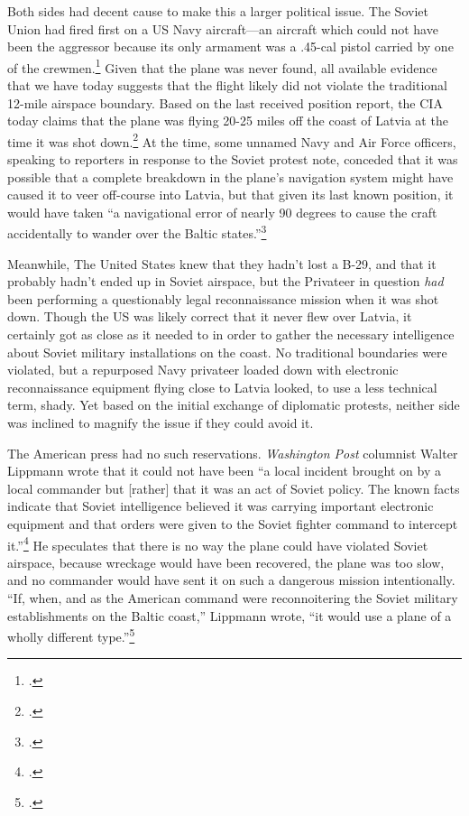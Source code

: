 \documentclass{report}
\begin{document}
\begin{refsegment}
Both sides had decent cause to make this a larger political issue. The Soviet Union had fired first on a US Navy aircraft---an aircraft which could not have been the aggressor because its only armament was a .45-cal pistol carried by one of the crewmen.\footcite[p.~7]{peterson_maybe_1993} Given that the plane was never found, all available evidence that we have today suggests that the flight likely did not violate the traditional 12-mile airspace boundary. Based on the last received position report, the CIA today claims that the plane was flying 20-25 miles off the coast of Latvia at the time it was shot down.\footcite[p.~7]{peterson_maybe_1993} At the time, some unnamed Navy and Air Force officers, speaking to reporters in response to the Soviet protest note, conceded that it was possible that a complete breakdown in the plane's navigation system might have caused it to veer off-course into Latvia, but that given its last known position, it would have taken ``a navigational error of nearly 90 degrees to cause the craft accidentally to wander over the Baltic states.''\footcite[Technically, the  article credits the first statement about the possible electronic breakdown to ``Navy and Air Force officials'' and the 90 degrees statement to ``Aerial navigators.'' It is unclear whether the navigators in questions are with the US military, but it does not matter regardless.]{the_new_york_times_soviet_1950}

Meanwhile, The United States knew that they hadn't lost a B-29, and that it probably hadn't ended up in Soviet airspace, but the Privateer in question \emph{had} been performing a questionably legal reconnaissance mission when it was shot down. Though the US was likely correct that it never flew over Latvia, it certainly got as close as it needed to in order to gather the necessary intelligence about Soviet military installations on the coast. No traditional boundaries were violated, but a repurposed Navy privateer loaded down with electronic reconnaissance equipment flying close to Latvia looked, to use a less technical term, shady. Yet based on the initial exchange of diplomatic protests, neither side was inclined to magnify the issue if they could avoid it.

The American press had no such reservations. \emph{Washington Post} columnist Walter Lippmann wrote that it could not have been ``a local incident brought on by a local commander but [rather] that it was an act of Soviet policy. The known facts indicate that Soviet intelligence \textelp{} believed it was carrying important electronic equipment and that orders were given to the Soviet fighter command to intercept it.''\footcite{lippmann_baltic_1950} He speculates that there is no way the plane could have violated Soviet airspace, because wreckage would have been recovered, the plane was too slow, and no commander would have sent it on such a dangerous mission intentionally. ``If, when, and as the American command were reconnoitering the Soviet military establishments on the Baltic coast,'' Lippmann wrote, ``it would use a plane of a wholly different type.''\footcite{lippmann_baltic_1950}


\end{refsegment}
\end{document}
